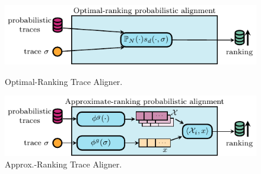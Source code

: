 \begin{figure}[!t]
	\begin{minipage}{.49\textwidth}
		\includegraphics[width=\textwidth]{images/aligner_exact.pdf}
		\caption{Optimal-Ranking Trace Aligner.}\label{fig:optimal}
	\end{minipage}\hfill \begin{minipage}{.49\textwidth}
		
		\includegraphics[width=\textwidth]{images/aligner.pdf}
		\caption{Approx.-Ranking Trace Aligner.}\label{fig:approximate}
	\end{minipage}
\end{figure}

